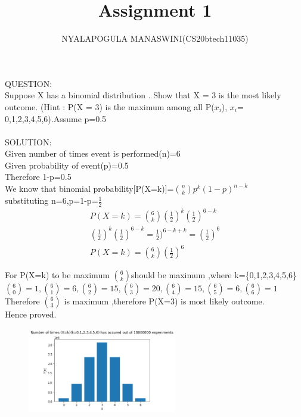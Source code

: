 \documentclass{assignment}
\begin{document}
\title{Assignment 1}
\author{NYALAPOGULA MANASWINI(CS20btech11035)}
\maketitle
\begin{paracol}{2}
\switchcolumn[0]
\begin{Large}
QUESTION:\\
Suppose X has a binomial distribution . Show
that X = 3 is the most likely outcome.
(Hint : P(X = 3) is the maximum among all
P($x_i$), $x_i$= 0,1,2,3,4,5,6).Assume p=0.5\\
\\
SOLUTION:\\
Given number of times event is performed(n)=6\\
Given probability of event(p)=0.5\\
Therefore 1-p=0.5\\
We know that binomial probability[P(X=k)]=$\binom{n}{k}p^k({1-p})^{n-k}$\\
substituting n=6,p=1-p=$\frac{1}{2}$\\
\begin{align*}
P(X=k)=\binom{6}{k}(\frac{1}{2})^k(\frac{1}{2})^{6-k}\\
(\frac{1}{2})^k(\frac{1}{2})^{6-k}=\frac{1}{2})^{6-k+k}=(\frac{1}{2})^6\\
P(X=k)=\binom{6}{k}(\frac{1}{2})^6
\end{align*}

For P(X=k) to be maximum $\binom{6}{k}$should be maximum ,where k=\{0,1,2,3,4,5,6\}
$\binom{6}{0}=1  , \binom{6}{1}=6,\binom{6}{2}=15,\binom{6}{3}=20,\binom{6}{4}=15,\binom{6}{5}=6,\binom{6}{6}=1$\\
Therefore $\binom{6}{3}$ is maximum ,therefore P(X=3) is most likely outcome.\\
Hence proved.
\switchcolumn[1]
\begin{figure}
\begin{center}
\includegraphics[width=0.58\textwidth]{assignment1.png}
\end{center}
\end{figure}
\end{Large}
\end{paracol}
\end{document}
